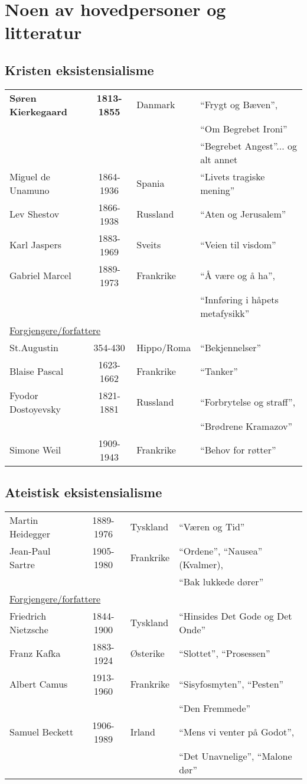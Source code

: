 \documentclass[12pt]{article}
\newcommand{\und}[1]{\underline{#1}}
\begin{document}
\newpage
\section{Noen av hovedpersoner og  litteratur}

\subsection*{Kristen eksistensialisme}
%
\begin{tabular}{lcll}
{\bf S{\o}ren Kierkegaard} & {\bf 1813-1855} & Danmark & ``Frygt og B{\ae}ven'', \\
    & & & ``Om Begrebet Ironi'' \\
    & & & ``Begrebet Angest''... og alt annet \\
Miguel de Unamuno & 1864-1936 & Spania & ``Livets tragiske mening''\\
Lev Shestov & 1866-1938 & Russland & ``Aten og Jerusalem'' \\
Karl Jaspers & 1883-1969 & Sveits & ``Veien til visdom'' \\
Gabriel Marcel & 1889-1973 & Frankrike & ``{\AA} v{\ae}re og {\aa} ha'',\\
    & & & ``Innf{\o}ring i h{\aa}pets metafysikk'' \\ 
\multicolumn{3}{l}{\und{Forgjengere/forfattere}} \\
St.Augustin & 354-430 & Hippo/Roma  & ``Bekjennelser'' \\
Blaise Pascal & 1623-1662 & Frankrike & ``Tanker'' \\
Fyodor Dostoyevsky & 1821-1881 & Russland & ``Forbrytelse og straff'', \\
    & & & ``Br{\o}drene Kramazov''\\
Simone Weil & 1909-1943 & Frankrike & ``Behov for r{\o}tter''
\end{tabular}


\subsection*{Ateistisk eksistensialisme}
%
\noindent
\begin{tabular}{lcll}
Martin Heidegger & 1889-1976 & Tyskland & ``V{\ae}ren og Tid'' \\
Jean-Paul Sartre & 1905-1980 & Frankrike & ``Ordene'', ``Nausea'' (Kvalmer),\\
  & & & ``Bak lukkede d{\o}rer''\\ 
\multicolumn{3}{l}{\und{Forgjengere/forfattere}} \\
Friedrich Nietzsche& 1844-1900 & Tyskland & ``Hinsides Det Gode og Det Onde''\\
Franz Kafka & 1883-1924 & {\O}sterike & ``Slottet'', ``Prosessen''\\
Albert Camus & 1913-1960 & Frankrike  & ``Sisyfosmyten'', ``Pesten''\\
   & & & ``Den Fremmede'' \\
Samuel Beckett & 1906-1989 & Irland & ``Mens vi venter p{\aa} Godot'', \\
   & & & ``Det Unavnelige'', ``Malone d{\o}r''
\end{tabular}
\end{document}
